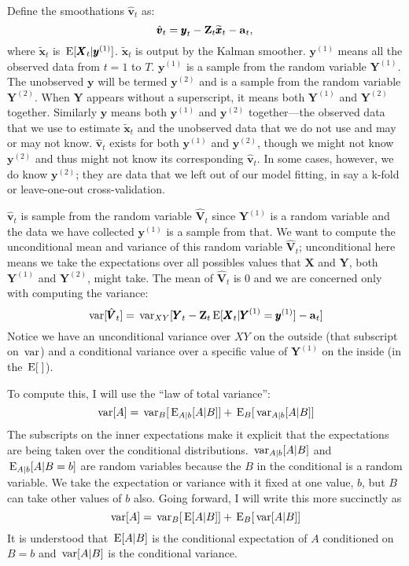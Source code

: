 \documentclass[]{article}
\def\XI{\mbox{\boldmath $\Xi$}}
\def\E{\,\textup{\textrm{E}}}
\def\VV{\mbox{$\pmb{V}$}}	\def\vv{\mbox{$\pmb{v}$}}
\def\XX{\mbox{$\pmb{X}$}}	\def\xx{\mbox{$\pmb{x}$}}
\def\YY{\mbox{$\pmb{Y}$}}	\def\yy{\mbox{$\pmb{y}$}}
\def\ZZ{\mbox{$\mathbf Z$}}	\def\zz{\mbox{$\mathbf z$}}	\def\Zb{\mbox{$\mathbf M$}} \def\Za{\mbox{$\mathbf N$}} \def\Zm{\XI}
\def\var{\,\textup{\textrm{var}}}
\def\hatxt{\widetilde{\xx}_t}
\begin{document}
Define the smoothations $\hat{\vv}_t$ as:
\begin{equation}\label{eq:vtT}
\hat{\vv}_t = \yy_t - \ZZ_t\hatxt - \aa_t,
\end{equation}
where  $\hatxt$ is $\E[\XX_t|\yy^{(1)}]$. $\hatxt$ is output by the Kalman smoother. $\yy^{(1)}$ means all the observed data from $t=1$ to $T$. $\yy^{(1)}$ is a sample from the random variable $\YY^{(1)}$. The unobserved $\yy$ will be termed $\yy^{(2)}$ and is a sample from the random variable $\YY^{(2)}$. When $\YY$ appears without a superscript, it means both $\YY^{(1)}$ and $\YY^{(2)}$ together. Similarly $\yy$ means both $\yy^{(1)}$ and $\yy^{(2)}$ together---the observed data that we use to estimate $\hatxt$ and the unobserved data that we do not use and may or may not know. $\hat{\vv}_t$ exists for both $\yy^{(1)}$ and $\yy^{(2)}$, though we might not know $\yy^{(2)}$ and thus might not know its corresponding $\hat{\vv}_t$. In some cases, however, we do know $\yy^{(2)}$; they are data that we left out of our model fitting, in say a k-fold or leave-one-out cross-validation.

$\hat{\vv}_t$ is sample from the random variable $\hat{\VV}_t$ since $\YY^{(1)}$ is a random variable and the data we have collected $\yy^{(1)}$ is a sample from that.  We want to compute the unconditional mean and variance of this random variable $\hat{\VV}_t$; unconditional here means we take the expectations over all possibles values that $\XX$ and $\YY$, both $\YY^{(1)}$ and $\YY^{(2)}$, might take. The mean of $\hat{\VV}_t$ is 0 and we are concerned only with computing the variance:
\begin{equation}\label{eq:var.vtT}
\var[\hat{\VV}_t] = \var_{XY}[\YY_t - \ZZ_t\E[\XX_t|\YY^{(1)}=\yy^{(1)}] - \aa_t]
\end{equation}
Notice we have an unconditional variance over $XY$ on the outside (that subscript on $\var$) and a conditional variance over a specific value of $\YY^{(1)}$ on the inside (in the $\E[\;]$).

To compute this, I will use the ``law of total variance'':
\begin{equation}
\var[A] = \var_B[\E_{A|b}[A|B]] + \E_B[\var_{A|b}[A|B]]
\end{equation}
The subscripts on the inner expectations make it explicit that the expectations are being taken over the conditional distributions.  $\var_{A|b}[A|B]$ and $\E_{A|b}[A|B=b]$ are random variables because the $B$ in the conditional is a random variable. We take the expectation or variance with it fixed at one value, $b$, but $B$ can take other values of $b$ also.  Going forward, I will write this more succinctly as
\begin{equation}
\var[A] = \var_B[\E[A|B]] + \E_B[\var[A|B]]
\end{equation}
It is understood that $\E[A|B]$ is the conditional expectation of $A$ conditioned on $B=b$ and $\var[A|B]$ is the conditional variance.
\end{document}
